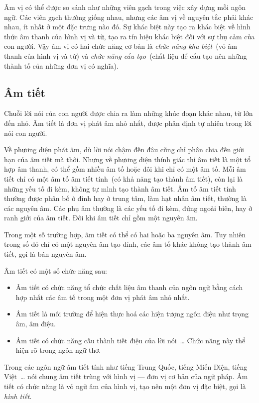 \documentclass[a4paper,oneside,14pt]{extbook} %
\begin{document}
Âm vị có thể được so sánh như những viên gạch trong việc xây dựng mỗi
ngôn ngữ. Các viên gạch thường giống nhau, nhưng các âm vị về nguyên
tắc phải khác nhau, ít nhất ở một đặc trưng nào đó. Sự khác biệt này
tạo ra khác biệt về hình thức âm thanh của hình vị và từ, tạo ra tín
hiệu khác biệt đối với sự thụ cảm của con người. Vậy âm vị có hai chức
năng cơ bản là {\em chức năng khu biệt}~(vỏ âm thanh của hình vị và
từ) và {\em chức năng cấu tạo}~(chất liệu để cấu tạo nên
những thành tố của những đơn vị có nghĩa).


\subsection{Âm tiết}

Chuỗi lời nói của con người được chia ra làm những khúc đoạn khác
nhau, từ lớn đến nhỏ. Âm tiết là đơn vị phát âm nhỏ nhất, được phân
định tự nhiên trong lời nói con người.

Về phương diện phát âm, dù lời nói chậm đến đâu cũng chỉ phân chia đến
giới hạn của âm tiết mà thôi. Nhưng về phương diện thính giác thì âm
tiết là một tổ hợp âm thanh, có thể gồm nhiều âm tố hoặc đôi khi chỉ
có một âm tố. Mỗi âm tiết chỉ có một âm tố âm tiết tính~(có khả năng
tạo thành âm tiết), còn lại là những yếu tố đi kèm, không tự mình tạo
thành âm tiết. Âm tố âm tiết tính thường được phân bố ở đỉnh hay ở
trung tâm, làm hạt nhân âm tiết, thường là các nguyên âm. Các phụ âm
thường là các yếu tố đi kèm, đứng ngoài biên, hay ở ranh giới của âm
tiết. Đôi khi âm tiết chỉ gồm một nguyên âm.

Trong một số trường hợp, âm tiết có thể có hai hoặc ba nguyên âm. Tuy
nhiên trong số đó chỉ có một nguyên âm tạo đỉnh, các âm tố khác không
tạo thành âm tiết, gọi là bán nguyên âm.

Âm tiết có một số chức năng sau:
\begin{itemize}
\item Âm tiết có chức năng tổ chức chất liệu âm thanh của ngôn ngữ
  bằng cách hợp nhất các âm tố trong một đơn vị phát âm nhỏ nhất.
\item Âm tiết là môi trường để hiện thực hoá các hiện tượng ngôn điệu
  như trọng âm, âm điệu.
\item Âm tiết có chức năng cấu thành tiết điệu của lời nói~\ldots{} Chức
  năng này thể hiện rõ trong ngôn ngữ thơ.
\end{itemize}

Trong các ngôn ngữ âm tiết tính như tiếng Trung Quốc, tiếng Miến Điện,
tiếng Việt~\ldots{} nói chung âm tiết trùng với hình vị --- đơn vị cơ
bản của ngữ pháp. Âm tiết có chức năng là vỏ ngữ âm của hình vị, tạo
nên một đơn vị đặc biệt, gọi là {\em hình tiết}.
\end{document}
